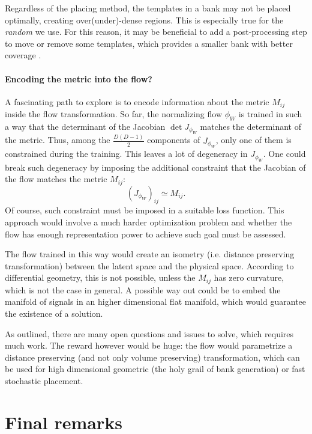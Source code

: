 \documentclass[twocolumn,showpacs,preprintnumbers,nofootinbib,prd,
superscriptaddress,10pt]{revtex4-2}
\begin{document}
Regardless of the placing method, the templates in a bank may not be placed optimally, creating over(under)-dense regions. This is especially true for the {\it random} we use. For this reason, it may be beneficial to add a post-processing step to move or remove some templates, which provides a smaller bank with better coverage \cite{Indik:2017vqq}.

\paragraph{Encoding the metric into the flow?}

A fascinating path to explore is to encode information about the metric $M_{ij}$ inside the flow transformation.
So far, the normalizing flow $\phi_W$ is trained in such a way that the determinant of the Jacobian $\det J_{\phi_W}$ matches the determinant of the metric.
Thus, among the $\frac{D(D-1)}{2}$ components of $J_{\phi_W}$, only one of them is constrained during the training. This leaves a lot of degeneracy in $J_{\phi_W}$.
One could break such degeneracy by imposing the additional constraint that the Jacobian of the flow matches the metric $M_{ij}$:
\begin{equation}
	(J_{\phi_W})_{ij} \simeq M_{ij}.
\end{equation}
Of course, such constraint must be imposed in a suitable loss function.
This approach would involve a much harder optimization problem and whether the flow has enough representation power to achieve such goal must be assessed.

The flow trained in this way would create an isometry (i.e. distance preserving transformation) between the latent space and the physical space. According to differential geometry, this is not possible, unless the $M_{ij}$ has zero curvature, which is not the case in general. A possible way out could be to embed the manifold of signals in an higher dimensional flat manifold, which would guarantee the existence of a solution.

As outlined, there are many open questions and issues to solve, which requires much work. The reward however would be huge: the flow would parametrize a distance preserving (and not only volume preserving) transformation, which can be used for high dimensional geometric (the holy grail of bank generation) or fast stochastic placement.

\section{Final remarks} \label{sec:conclusion}
\end{document}

